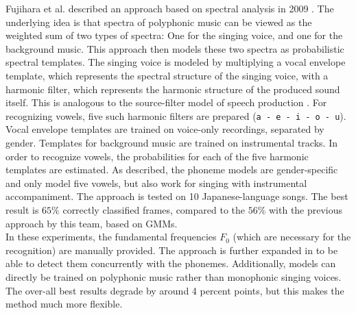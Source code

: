 Fujihara et al. described an approach based on spectral analysis in 2009 \cite{fujihara_phonemes}. The underlying idea is that spectra of polyphonic music can be viewed as the weighted sum of two types of spectra: One for the singing voice, and one for the background music. This approach then models these two spectra as probabilistic spectral templates. The singing voice is modeled by multiplying a vocal envelope template, which represents the spectral structure of the singing voice, with a harmonic filter, which represents the harmonic structure of the produced sound itself. This is analogous to the source-filter model of speech production \cite{Fant1981}. For recognizing vowels, five such harmonic filters are prepared (\texttt{a - e - i - o - u}). Vocal envelope templates are trained on voice-only recordings, separated by gender. Templates for background music are trained on instrumental tracks. In order to recognize vowels, the probabilities for each of the five harmonic templates are estimated. 
As described, the phoneme models are gender-specific and only model five vowels, but also work for singing with instrumental accompaniment. The approach is tested on 10 Japanese-language songs. The best result is $65\%$ correctly classified frames, compared to the $56\%$ with the previous approach by this team, based on GMMs. \\
In these experiments, the fundamental frequencies $F_0$ (which are necessary for the recognition) are manually provided. The approach is further expanded in \cite{concurrent_f0_phonemes} to be able to detect them concurrently with the phonemes. Additionally, models can directly be trained on polyphonic music rather than monophonic singing voices. The over-all best results degrade by around 4 percent points, but this makes the method much more flexible.

